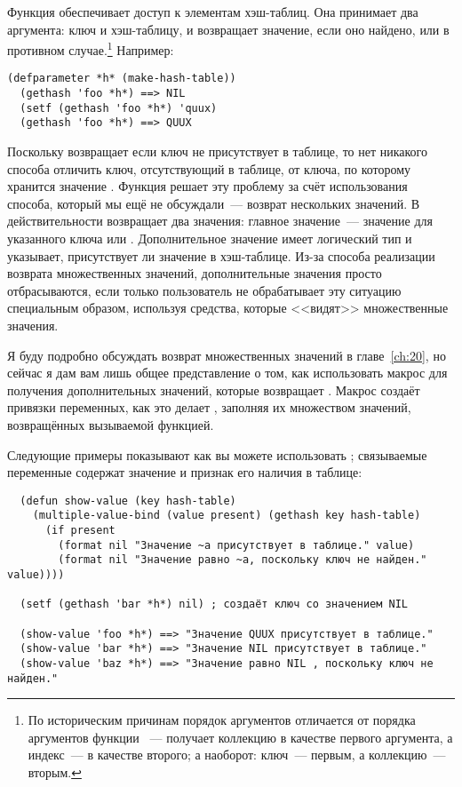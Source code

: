 Функция  обеспечивает доступ к элементам хэш-таблиц.  Она принимает два
аргумента: ключ и хэш-таблицу, и возвращает значение, если оно найдено, или  в
противном случае.\footnote{По историческим причинам порядок аргументов 
  отличается от порядка аргументов функции ~---  получает коллекцию в
  качестве первого аргумента, а индекс~--- в качестве второго; а  наоборот:
  ключ~--- первым, а коллекцию~--- вторым.}  Например:

\begin{lstlisting}[style=lisprepl]
  (defparameter *h* (make-hash-table))
  (gethash 'foo *h*) ==> NIL
  (setf (gethash 'foo *h*) 'quux)
  (gethash 'foo *h*) ==> QUUX
\end{lstlisting}

Поскольку  возвращает  если ключ не присутствует в таблице, то нет
никакого способа отличить ключ, отсутствующий в таблице, от ключа, по которому хранится
значение .  Функция  решает эту проблему за счёт использования
способа, который мы ещё не обсуждали~--- возврат нескольких значений.  В действительности
 возвращает два значения: главное значение~--- значение для указанного ключа
или .  Дополнительное значение имеет логический тип и указывает, присутствует ли
значение в хэш-таблице.  Из-за способа реализации возврата множественных значений,
дополнительные значения просто отбрасываются, если только пользователь не обрабатывает эту
ситуацию специальным образом, используя средства, которые <<видят>> множественные значения.

Я буду подробно обсуждать возврат множественных значений в главе~\ref{ch:20}, но сейчас я
дам вам лишь общее представление о том, как использовать макрос 
для получения дополнительных значений, которые возвращает .  Макрос
 создаёт привязки переменных, как это делает ,
заполняя их множеством значений, возвращённых вызываемой функцией.

Следующие примеры показывают как вы можете использовать ;
связываемые переменные содержат значение и признак его наличия в таблице:

\begin{lstlisting}  
  (defun show-value (key hash-table)
    (multiple-value-bind (value present) (gethash key hash-table)
      (if present
        (format nil "Значение ~a присутствует в таблице." value)
        (format nil "Значение равно ~a, поскольку ключ не найден." value))))

  (setf (gethash 'bar *h*) nil) ; создаёт ключ со значением NIL

  (show-value 'foo *h*) ==> "Значение QUUX присутствует в таблице."
  (show-value 'bar *h*) ==> "Значение NIL присутствует в таблице."
  (show-value 'baz *h*) ==> "Значение равно NIL , поскольку ключ не найден."
\end{lstlisting}

